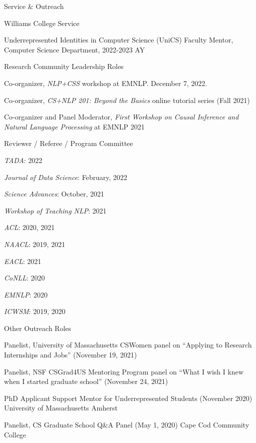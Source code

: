 \documentclass{resume} %
\begin{document}
\begin{rSection}{Service \& Outreach}

\begin{rSubsection}{Williams College Service}{}{}{}
\item Underrepresented Identities in Computer Science (UniCS) Faculty Mentor, Computer Science Department, 2022-2023 AY 
\end{rSubsection}

\begin{rSubsection}{Research Community Leadership Roles}{}{}{}
\item Co-organizer, \emph{NLP+CSS} workshop at EMNLP. December 7, 2022. 
\item Co-organizer, \emph{CS+NLP 201: Beyond the Basics} online tutorial series (Fall 2021)
\item Co-organizer and Panel Moderator, \emph{First Workshop on Causal Inference and Natural Language Processing} at EMNLP 2021

\end{rSubsection}

\noindent
\begin{rSubsection}{Reviewer / Referee / Program Committee}{}{}{}
\item \emph{TADA}: 2022
\item \emph{Journal of Data Science}: February, 2022
\item \emph{Science Advances}: October, 2021
\item \emph{Workshop of Teaching NLP}: 2021
\item \emph{ACL}: 2020, 2021
\item \emph{NAACL}: 2019, 2021
\item \emph{EACL}: 2021 
\item \emph{CoNLL}: 2020 
\item \emph{EMNLP}: 2020 
\item \emph{ICWSM}: 2019, 2020
\end{rSubsection}

\begin{rSubsection}{Other Outreach Roles}{}{}{}
\item Panelist, University of Massachusetts CSWomen panel on ``Applying to Research Internships and Jobs'' (November 19, 2021)
\item Panelist, NSF CSGrad4US Mentoring Program panel on ``What I wish I knew when I started graduate school'' (November 24, 2021)
\item 
{PhD Applicant Support Mentor for Underrepresented Students} ({November 2020}) {University of Massachusetts Amherst}
\item 
{Panelist, CS Graduate School Q\&A Panel} ({May 1, 2020}) {Cape Cod Community College}


\end{rSubsection}
\end{rSection}
\end{document}
